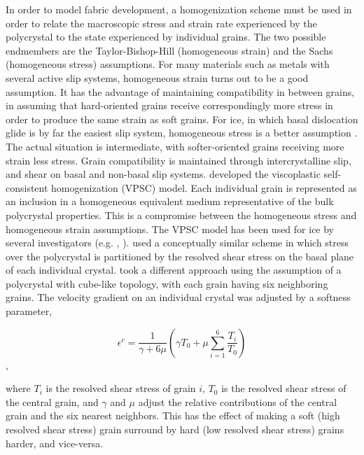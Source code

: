 \documentclass{igs}
\begin{document}
In order to model fabric development, a homogenization scheme must be used in order to relate the macroscopic stress and strain rate experienced by the polycrystal to the state experienced by individual grains. The two possible endmembers are the Taylor-Bishop-Hill (homogeneous strain) \citep{taylor} and the Sachs (homogeneous stress) \citep{sachs} assumptions. For many materials such as metals with several active slip systems, homogeneous strain turns out to be a good assumption. It has the advantage of maintaining compatibility in between grains, in assuming that hard-oriented grains receive correspondingly more stress in order to produce the same strain as soft grains. For ice, in which basal dislocation glide is by far the easiest slip system, homogeneous stress is a better assumption \citep{thorsteinsson2002nni}. The actual situation is intermediate, with softer-oriented grains receiving more strain less stress. Grain compatibility is maintained through intercrystalline slip, and shear on basal and non-basal slip systems. \citet{molinari} developed the viscoplastic self-consistent homogenization (VPSC) model. Each individual grain is represented as an inclusion in a homogeneous equivalent medium representative of the bulk polycrystal properties. This is a compromise between the homogeneous stress and homogeneous strain assumptions. The VPSC model has been used for ice by several investigators (e.g. \citet{gillet2005}, \citet{castelnau1997}). \citet{azuma96} used a conceptually similar scheme in which stress over the polycrystal is partitioned by the resolved shear stress on the basal plane of each individual crystal. \citet{thorsteinsson2002nni} took a different approach using the assumption of a polycrystal with cube-like topology, with each grain having six neighboring grains. The velocity gradient on an individual crystal was adjusted by a softness parameter,

\begin{equation}
\epsilon^c = \frac {1}{\gamma + 6 \mu} \left( \gamma T_0 + \mu \sum_{i=1}^6 \frac{T_i}{T_0} \right)
\end{equation},

where $T_i$ is the resolved shear stress of grain $i$, $T_0$ is the resolved shear stress of the central grain, and $\gamma$ and $\mu$ adjust the relative contributions of the central grain and the six nearest neighbors. This has the effect of making a soft (high resolved shear stress) grain surround by hard (low resolved shear stress) grains harder, and vice-versa.
\end{document}
